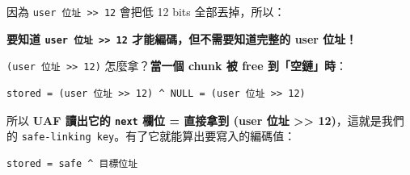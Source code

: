 \documentclass[10pt,a4paper]{article}
\renewenvironment{quote}{%
  \begin{mdframed}[linewidth=0pt,innerleftmargin=0pt,innerrightmargin=0pt,
    innerbottommargin=0pt,innertopmargin=0pt,skipabove=0.55em,skipbelow=0.55em,
    leftmargin=0.9em,rightmargin=0.4em,startcode={\color{quotebar}\vrule width 2.6pt},%
    endcode={}]%
  \itshape\color{black}%
}{%
  \end{mdframed}%
}
\begin{document}
因為 \texttt{user\ \allowbreak{}位址\ \allowbreak{}\textgreater{}\allowbreak{}\textgreater{}\allowbreak{}\ \allowbreak{}12} 會把低 12
bits 全部丟掉，所以：

\begin{quote}
\textbf{要知道 \texttt{user\ \allowbreak{}位址\ \allowbreak{}\textgreater{}\allowbreak{}\textgreater{}\allowbreak{}\ \allowbreak{}12}
才能編碼，但不需要知道完整的 user 位址！}
\end{quote}

\texttt{(user\ \allowbreak{}位址\ \allowbreak{}\textgreater{}\allowbreak{}\textgreater{}\allowbreak{}\ \allowbreak{}12)}
怎麼拿？\textbf{當一個 chunk 被 free 到「空鏈」時}：

\begin{Verbatim}[breaklines=true,breakanywhere=true,breakautoindent=false,fontsize=\fontsize{7.0}{9.5}\selectfont]
   stored = (user 位址 >> 12) ^ NULL = (user 位址 >> 12)
\end{Verbatim}

所以 \textbf{UAF 讀出它的 \texttt{next} 欄位 = 直接拿到 (user 位址
\textgreater\textgreater{} 12)}，這就是我們的
\texttt{safe-\allowbreak{}linking\ \allowbreak{}key}。有了它就能算出要寫入的編碼值：

\begin{Verbatim}[breaklines=true,breakanywhere=true,breakautoindent=false,fontsize=\fontsize{7.0}{9.5}\selectfont]
   stored = safe ^ 目標位址
\end{Verbatim}
\end{document}
